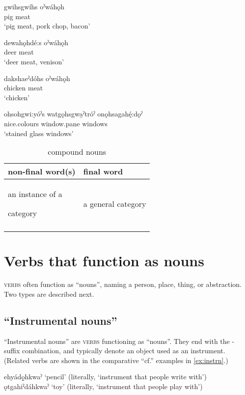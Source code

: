 \ea\label{ex:compn}
\gll gwihsgwíhs oˀwáhǫh\\
pig meat\\
\glt ‘pig meat, pork chop, bacon’
\z

\ea\label{ex:compn2}
\gll dewahǫhdé:s oˀwáhǫh \\
deer meat\\
\glt ‘deer meat, venison’
\z

\ea\label{ex:compn4}
\gll dakshaeˀdóhs oˀwáhǫh\\
chicken meat\\
\glt ‘chicken’ 
\z

\ea\label{ex:compn5}
\gll ohsohgwi:yóˀs watgǫhsgwa̱ˀtróˀ onǫhsagahę́:dǫˀ \\
nice.colours window.pane windows\\
\glt ‘stained glass windows’ 
\z

\begin{table}
\caption{compound nouns}
\label{figtab:1:compoundnoun}
\begin{tabularx}{.66\textwidth}{XX}
\lsptoprule
non-final word(s) & final word\\
\midrule
an instance of a 

category & a general category \\
\lspbottomrule
\end{tabularx}
\end{table}


\section{Verbs that function as nouns} \label{ch:Verbs that function as nouns}
\textsc{verbs} often function as “nouns”, naming a person, place, thing, or abstraction. Two types are described next.

\subsection{“Instrumental nouns”} \label{ch:Instrumental nouns}
“Instrumental nouns” are \textsc{verbs} functioning as “nouns”. They end with the  \textsc{\instrumental}-{\habitual} suffix combination, and typically denote an object used as an instrument. (Related verbs are shown in the comparative “cf.” examples in \ref{ex:instrn}.)

\ea\label{ex:instrn}
\ea ehyádǫ̱hkwaˀ ‘pencil’ (literally, ‘instrument that people write with’)
\ex ǫtgahiˀdáhkwaˀ ‘toy’ (literally, ‘instrument that people play with’)
\z
\z

